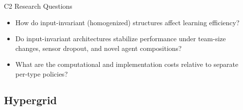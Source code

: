 \begin{frame}{C2 Research Questions}
    \begin{itemize}
        \item[\textbf{RQ2.1}] 
        How do input-invariant (homogenized) structures affect learning efficiency?
        \item[\textbf{RQ2.2}] 
        Do input-invariant architectures stabilize performance under
        team-size changes, sensor dropout, and novel agent compositions?
        \item[\textbf{RQ2.3}] 
        What are the computational and implementation costs
        relative to separate per-type policies?
    \end{itemize}
        
\end{frame}


\subsection{Hypergrid}


